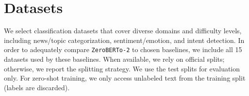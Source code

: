 \documentclass[]{politex-xico}
\begin{document}










\section{Datasets}
\label{sec:datasets}

We select classification datasets that cover diverse domains and difficulty levels, including news/topic categorization, sentiment/emotion, and intent detection. In order to adequately compare \texttt{ZeroBERTo-2} to chosen baselines, we include all 15 datasets used by these baselines. When available, we rely on official splits; otherwise, we report the splitting strategy. We use the test splits for evaluation only. For zero-shot training, we only access unlabeled text from the training split (labels are discarded). 
\end{document}
